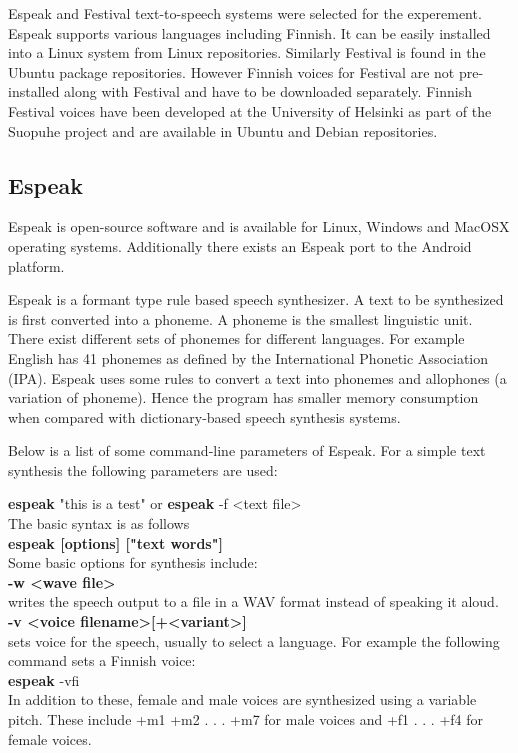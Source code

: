 \documentclass[11pt,a4paper,oneside,article]{memoir}
\begin{document}
Espeak and Festival text-to-speech systems were selected for the experement. Espeak supports various languages including Finnish. It can be easily installed into a Linux system from Linux repositories. Similarly Festival is found in the Ubuntu  package repositories. However Finnish voices for Festival are not pre-installed along with Festival and have to be downloaded separately. Finnish Festival voices have been developed at the University of Helsinki as part of the Suopuhe project and are available in Ubuntu and Debian repositories. 


\subsection{Espeak}

Espeak is open-source software and is available for Linux, Windows and MacOSX operating systems. Additionally there exists an Espeak port to the Android platform. 

Espeak is a formant type rule based speech synthesizer. A text to be synthesized is first converted into a phoneme. A phoneme is the smallest linguistic unit. There exist different sets of phonemes for different languages. For example English has 41 phonemes as defined by the International Phonetic Association (IPA). Espeak uses some rules to convert a text into  phonemes and allophones (a variation of phoneme). Hence the program has smaller memory consumption when compared with dictionary-based speech synthesis systems.


Below is a list of some command-line parameters of Espeak. For a simple text synthesis the following parameters are used:

\setlength{\leftskip}{1cm}
\textbf{espeak} "this is a test" or \textbf{espeak} -f <text file>\\
The basic syntax is as follows\\
\textbf{espeak [options] ["text words"]}\\
Some basic options for synthesis include:\\
\textbf{-w <wave file>}\\
writes the speech output to a file in a WAV format instead of speaking it aloud.\\ 
\textbf{-v <voice filename>[+<variant>]}\\
sets voice for the speech, usually to select a language. For example the following command sets a Finnish voice:\\
\textbf{espeak} -vfi\\
In addition to these, female and male voices are synthesized using a variable pitch. These include +m1 +m2 . . . +m7 for male voices and +f1 . . . +f4 for female voices.
\end{document}
